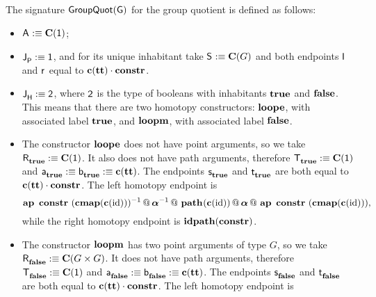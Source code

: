 The signature $\groupquot G$ for the group quotient is defined as follows:
\begin{itemize}
\item $\pointconstr \eqdef \constantP{\unit}$;
\item $\pathlabel \eqdef \unit$, and for its unique inhabitant take $\patharg \eqdef \constantP{G}$ and both endpoints $\pathleft$ and $\pathright$ equal to $\comp{\Ce(\unitt)}{\constr}$.
\item $\homotlabel \eqdef \bool$, where $\bool$ is the type of
booleans with inhabitants $\booltrue$ and $\boolfalse$. This means
that there are two homotopy constructors: $\groupquotloope$, with
associated label $\booltrue$, and $\groupquotloopm$, with associated
label $\boolfalse$.
\item The constructor $\groupquotloope$ does not have
point arguments, so we take $\homotpointarg_{\booltrue}
\eqdef \constantP{\unit}$. It also does not have path arguments, therefore
$\homotpathtarg_{\booltrue} \eqdef \constantP{\unit}$ and
$\pathargleft_{\booltrue} \eqdef \pathargright_{\booltrue} \eqdef \Ce(\unitt)$.
The endpoints $\homotpathleft_{\booltrue}$ and
$\homotpathright_{\booltrue}$ are both equal to
$\comp{\Ce(\unitt)}{\constr}$. The left homotopy endpoint is
\[
\hconcat{\hap{\constr}{\hinv{(\hcompconst{\Ce(\id)})}}}{
\hconcat{\hinv{\hassocN}}{
\hconcat{\hconstr{}{\Ce(\id)}}{
\hconcat{\hassocN}{\hap{\constr}{(\hcompconst{\Ce(\id)})}}
}}},
\]
while the right homotopy endpoint is $\hrefl{\constr}$.
\item The constructor $\groupquotloopm$ has two point
arguments of type $G$, so we take $\homotpointarg_{\boolfalse}
\eqdef \constantP{G \times G}$. It does not have path arguments, therefore
$\homotpathtarg_{\boolfalse} \eqdef \constantP{\unit}$ and
$\pathargleft_{\boolfalse} \eqdef \pathargright_{\boolfalse}
\eqdef \Ce(\unitt)$.  The endpoints $\homotpathleft_{\boolfalse}$ and
$\homotpathright_{\boolfalse}$ are both equal to
$\comp{\Ce(\unitt)}{\constr}$. The left homotopy endpoint is

\end{itemize}
